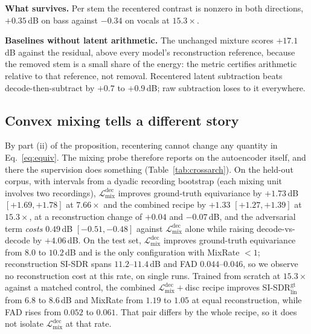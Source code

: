\documentclass[conference]{IEEEtran}
\newcommand{\tabref}[1]{Table~\ref{#1}}
\newcommand{\secref}[1]{Section~\ref{#1}}
\newcommand{\Ldec}{\mathcal{L}_\mathrm{mix}^\mathrm{dec}}
\begin{document}
\textbf{What survives.} Per stem the recentered contrast is nonzero in both
directions, $+0.35$\,dB on bass against $-0.34$ on vocals at $15.3\times$.

\textbf{Baselines without latent arithmetic.} The unchanged mixture scores
$+17.1$\,dB against the residual, above every model's reconstruction
reference, because the removed stem is a small share of the energy: the
metric certifies arithmetic relative to that reference, not removal.
Recentered latent subtraction beats decode-then-subtract by $+0.7$ to
$+0.9$\,dB; raw subtraction loses to it everywhere.

\subsection{Convex mixing tells a different story}\label{sec:mixing}
By part (ii) of the proposition, recentering cannot change any quantity in
Eq.~\ref{eq:equiv}. The mixing probe therefore reports on the autoencoder
itself, and there the supervision does something (\tabref{tab:crossarch}). On the held-out corpus, with intervals from a dyadic recording bootstrap
(each mixing unit involves two recordings), $\Ldec$ improves ground-truth equivariance by $+1.73$\,dB $[+1.69,+1.78]$ at
$7.66\times$ and the combined recipe by $+1.33$ $[+1.27,+1.39]$ at
$15.3\times$, at a reconstruction change of $+0.04$ and $-0.07$\,dB, and the
adversarial term \emph{costs} $0.49$\,dB $[-0.51,-0.48]$ against $\Ldec$
alone while raising decode-vs-decode by $+4.06$\,dB. On the test set, $\Ldec$ improves
ground-truth equivariance from $8.0$ to $10.2$\,dB and is the only
configuration with MixRate $<1$; reconstruction SI-SDR spans $11.2$--$11.4$\,dB and FAD $0.044$--$0.046$, so
we observe no reconstruction cost at this rate, on single runs. Trained from scratch at $15.3\times$ against a matched control, the combined
$\Ldec{+}$disc recipe improves SI-SDR$_\mathrm{lin}^\mathrm{gt}$ from $6.8$
to $8.6$\,dB and MixRate from $1.19$ to $1.05$ at equal reconstruction,
while FAD rises from $0.052$ to $0.061$. That pair differs by the whole
recipe, so it does not isolate $\Ldec$ at that rate.

\begin{table}[t]
  \centering\small
  \setlength{\tabcolsep}{2.0pt}
  
  \caption{Convex mixing across compression and architecture (full test set,
  $\alpha{=}0.5$, EMA weights for Music2Latent). The M2L ``fine-tune control''
  is the continued-training baseline with mixing disabled. These quantities
  are invariant to the intervention of \secref{sec:origin}.}
  \label{tab:crossarch}
\end{table}
\end{document}
